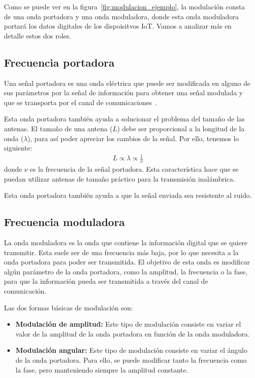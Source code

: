 \documentclass[12pt, letterpaper]{article}
\begin{document}
Como se puede ver en la figura~\ref{fig:modulacion_ejemplo}, la modulación consta de una onda portadora y una onda moduladora, donde esta onda moduladora portará los datos digitales de los dispoisitvos IoT. Vamos a analizar más en detalle   estos dos roles.

\subsection{Frecuencia portadora}
Una señal portadora es una onda eléctrica que puede ser modificada en alguno de sus parámetros por la señal de información para obtener una señal modulada y que se transporta por el canal de comunicaciones~\cite{modulacion-radioacademy}.

Esta onda portadora también ayuda a solucionar el problema del tamaño de las antenas. El tamaño de una antena ($L$) debe ser proporcional a la longitud de la onda ($\lambda$), para así poder apreciar los cambios de la señal. Por ello, tenemos lo siguiente:
\begin{align}
    L \propto \lambda \propto \frac{1}{\nu}
\end{align}
donde $\nu$ es la frecuencia de la señal portadora. Esta característica hace que se puedan utilizar antenas de tamaño práctico para la transmisión inalámbrica.

Esta onda portadora también ayuda a que la señal enviada sea resistente al ruido.

\subsection{Frecuencia moduladora}
La onda moduladora es la onda que contiene la información digital que se quiere transmitir. Esta suele ser de una frecuencia más baja, por lo que necesita a la onda portadora para poder ser transmitida. El objetivo de esta onda es modificar algún parámetro de la onda portadora, como la amplitud, la frecuencia o la fase, para que la información pueda ser transmitida a través del canal de comunicación.

Las dos formas básicas de modulación son:
\begin{itemize}
    \item \textbf{Modulación de amplitud:} Este tipo de modulación consiste en variar el valor de la amplitud de la onda portadora en función de la onda moduladora. 

    \item \textbf{Modulación angular:} Este tipo de modulación consiste en variar el ángulo de la onda portadora. Para ello, se puede modificar tanto la frecuencia como la fase, pero manteniendo siempre la amplitud constante.
\end{itemize}
\end{document}
